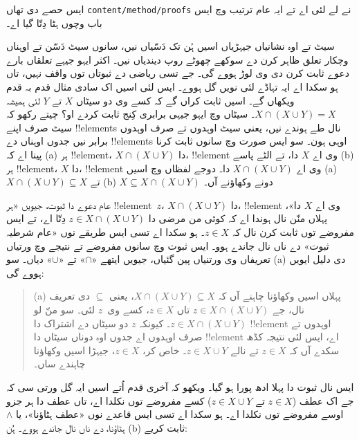 \documentclass[../../../include/open-logic-section]{subfiles}
\begin{document}

\begin{editorial}
ایس حصے دی تھاں \verb|content/method/proofs| نے لے لئی اے تے ایہ عام ترتیب وچ ایس باب وچوں ہٹا دِتّا گیا اے۔
\end{editorial}

\begin{explain}
سیٹ تے اوہ نشانیاں جیہڑیاں اسیں ہُن تک دَسّیاں نیں، سانوں سیٹ دَسّن تے اوہناں وچکار تعلق ظاہر کرن دے سوکھے چھوٹے روپ دیندیاں نیں۔ اکثر ایہو جیہے تعلقاں بارے دعوے ثابت کرن دی وی لوڑ ہووے گی۔ جے تسی ریاضی دے ثبوتاں توں واقف نہیں، تاں ہو سکدا اے ایہ تہاڈے لئی نویں گل ہووے۔ ایس لئی اسیں اک سادی مثال قدم بہ قدم ویکھاں گے۔ اسیں ثابت کراں گے کہ کسے وی دو سیٹاں $X$ تے $Y$ لئی ہمیشہ $X \cap
(X \cup Y) = X$۔ سیٹاں وچ ایہو جیہی برابری کِنج ثابت کردے او؟ چیتے رکھو کہ سیٹ صرف اپنے !!{element}s نال طے ہوندے نیں، یعنی سیٹ اوہدوں تے صرف اوہدوں برابر نیں جدوں اوہناں دے !!{element}s اوہی ہون۔ سو ایس صورت وچ سانوں ثابت کرنا پینا اے کہ (a) ہر !!{element}، $X \cap (X \cup
Y)$ دا، !!{element} وی اے $X$ دا، تے الٹے پاسے (b) ہر !!{element}، $X$ دا، !!{element} وی اے $X \cap (X \cup Y)$ دا۔ دوجے لفظاں وچ اسیں (a) $X \cap (X \cup Y) \subseteq X$ تے (b) $X \subseteq X \cap (X \cup Y)$ دونے وکھاؤنے آں۔

عام دعوے دا ثبوت، جیویں «ہر !!{element}~$z$، $X \cap (X
\cup Y)$ دا، !!{element} وی اے $X$ دا»، پہلاں منّن نال ہوندا اے کہ کوئی من مرضی دا $z \in X \cap (X \cup Y)$ دِتّا اے، تے ایس مفروضے توں ثابت کرن نال کہ $z \in X$۔ ہو سکدا اے تسی ایس طریقے نوں «عام شرطیہ ثبوت» دے ناں نال جاندے ہوو۔ ایس ثبوت وچ سانوں مفروضے تے نتیجے وچ ورتیاں تعریفاں وی ورتنیاں پین گئیاں، جیویں ایتھے «$\cap$» تے «$\cup$» دیاں۔ سو (a) دی دلیل ایویں ہووے گی:

\begin{quote}
(a) پہلاں اسیں وکھاؤنا چاہنے آں کہ $X \cap (X \cup Y) \subseteq X$، یعنی $\subseteq$ دی تعریف نال، جے $z \in X \cap (X \cup Y)$ تاں $z \in X$، کسے وی~$z$ لئی۔ سو منّ لو $z \in X \cap (X \cup
Y)$۔ کیونکہ $z$ دو سیٹاں دے اشتراک دا !!{element} اوہدوں تے صرف اوہدوں اے جدوں اوہ دوناں سیٹاں دا !!{element} اے، ایس لئی نتیجہ کڈھ سکدے آں کہ $z \in X$ تے نالے $z \in X \cup Y$۔ خاص کر، $z \in X$، جیہڑا اسیں وکھاؤنا چاہندے ساں۔
\end{quote}

ایس نال ثبوت دا پہلا ادھ پورا ہو گیا۔ ویکھو کہ آخری قدم اُتے اسیں ایہ گل ورتی سی کہ جے اک عطف ($z \in X$ تے $z \in X
\cup Y$) کسے مفروضے توں نکلدا اے، تاں عطف دا ہر جزو اوسے مفروضے توں نکلدا اے۔ ہو سکدا اے تسی ایس قاعدے نوں «عطف ہٹاؤنا»، یا $\land$ ہٹاؤنا، دے ناں نال جاندے ہووے۔ ہُن (b) ثابت کریے:


\end{explain}
\end{document}
